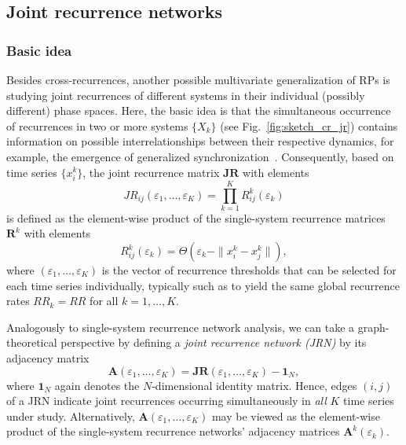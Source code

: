\documentclass[graybox]{svmult}
\begin{document}
\subsection{Joint recurrence networks}\label{sec:jrn}

\subsubsection{Basic idea}\label{sec:jrn_classic}

Besides cross-recurrences, another possible multivariate generalization of RPs is studying joint recurrences of different systems in their individual (possibly different) phase spaces. Here, the basic idea is that the simultaneous occurrence of recurrences in two or more systems $\{X_k\}$ (see Fig.~\ref{fig:sketch_cr_jr}) contains information on possible interrelationships between their respective dynamics, for example, the emergence of generalized synchronization~\cite{Romano2004PLA,Romano2005EPL}. Consequently, based on time series $\{x_i^k\}$, the joint recurrence matrix $\mathbf{JR}$ with elements
\begin{equation}
JR_{ij}(\varepsilon_1,\dots,\varepsilon_K)=\prod_{k=1}^K R_{ij}^k(\varepsilon_k)
\end{equation}
is defined as the element-wise product of the single-system recurrence matrices $\mathbf{R}^k$ with elements
\begin{equation}
R_{ij}^k(\varepsilon_k)=\Theta(\varepsilon_k - \|x_i^k - x_j^k\|), 
\end{equation}
where $(\varepsilon_1,\dots,\varepsilon_K)$ is the vector of recurrence thresholds that can be selected for each time series individually, typically such as to yield the same global recurrence rates $RR_k=RR$ for all $k=1,\dots,K$.

Analogously to single-system recurrence network analysis, we can take a graph-theoretical perspective by defining a \emph{joint recurrence network (JRN)} by its adjacency matrix
\begin{equation}
\mathbf{A}(\varepsilon_1,\dots,\varepsilon_K) = \mathbf{JR}(\varepsilon_1,\dots,\varepsilon_K) - \mathbf{1}_N,
\end{equation}
where $\mathbf{1}_N$ again denotes the $N$-dimensional identity matrix. Hence, edges $(i,j)$ of a JRN indicate joint recurrences occurring simultaneously in \emph{all} $K$ time series under study. Alternatively, $\mathbf{A}(\varepsilon_1,\dots,\varepsilon_K)$ may be viewed as the element-wise product of the single-system recurrence networks' adjacency matrices $\mathbf{A}^k(\varepsilon_k)$.
\end{document}

